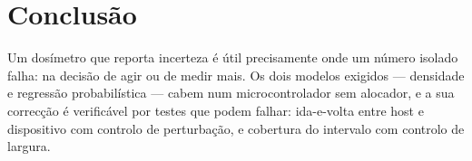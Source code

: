 \documentclass[10pt,a4paper]{article}
\begin{document}
\section{Conclusão}

Um dosímetro que reporta incerteza é útil precisamente onde um número isolado falha: na
decisão de agir ou de medir mais. Os dois modelos exigidos --- densidade e regressão
probabilística --- cabem num microcontrolador sem alocador, e a sua correcção é verificável
por testes que podem falhar: ida-e-volta entre host e dispositivo com controlo de perturbação,
e cobertura do intervalo com controlo de largura.
\end{document}
